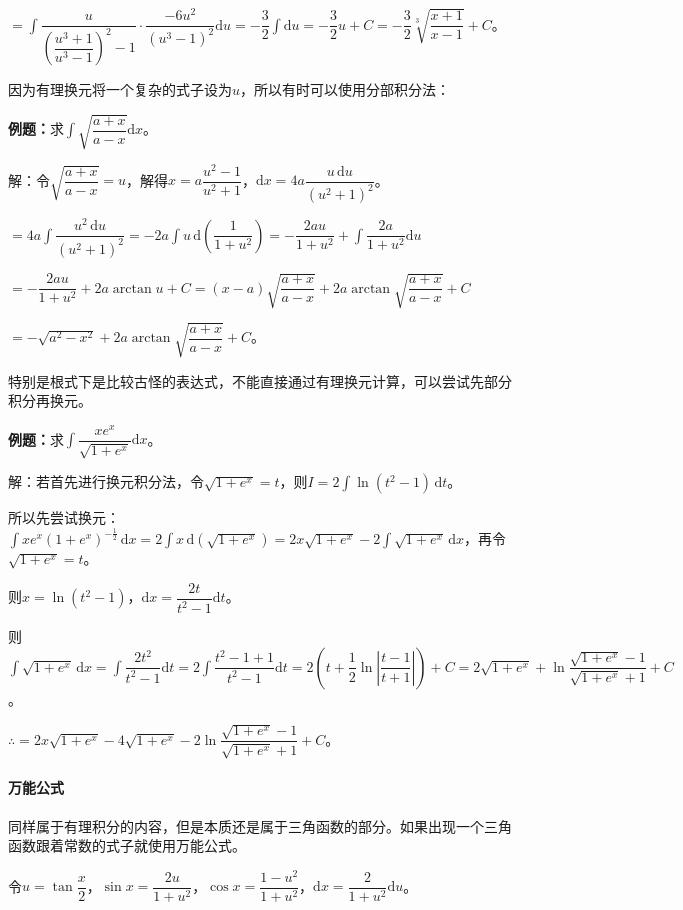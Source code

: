 \documentclass[UTF8, 12pt]{ctexart}
\begin{document}
$=\displaystyle{\int\dfrac{u}{\left(\dfrac{u^3+1}{u^3-1}\right)^2-1}\cdot\dfrac{-6u^2}{(u^3-1)^2}\textrm{d}u=-\dfrac{3}{2}\int\textrm{d}u}=-\dfrac{3}{2}u+C=-\dfrac{3}{2}\sqrt[3]{\dfrac{x+1}{x-1}}+C $。

因为有理换元将一个复杂的式子设为$u$，所以有时可以使用分部积分法：\medskip

\textbf{例题：}求$\displaystyle{\int\sqrt{\dfrac{a+x}{a-x}}\textrm{d}x}$。\medskip

解：令$\sqrt{\dfrac{a+x}{a-x}}=u$，解得$x=a\dfrac{u^2-1}{u^2+1}$，$\textrm{d}x=4a\dfrac{u\,\textrm{d}u}{(u^2+1)^2}$。

$=\displaystyle{4a\int\dfrac{u^2\,\textrm{d}u}{(u^2+1)^2}=-2a\int u\,\textrm{d}\left(\dfrac{1}{1+u^2}\right)=-\dfrac{2au}{1+u^2}+\int\dfrac{2a}{1+u^2}\textrm{d}u}$

$=-\dfrac{2au}{1+u^2}+2a\arctan u+C=(x-a)\sqrt{\dfrac{a+x}{a-x}}+2a\arctan\sqrt{\dfrac{a+x}{a-x}}+C$

$=-\sqrt{a^2-x^2}+2a\arctan\sqrt{\dfrac{a+x}{a-x}}+C$。

特别是根式下是比较古怪的表达式，不能直接通过有理换元计算，可以尝试先部分积分再换元。

\textbf{例题：}求$\displaystyle{\int\dfrac{xe^x}{\sqrt{1+e^x}}\textrm{d}x}$。

解：若首先进行换元积分法，令$\sqrt{1+e^x}=t$，则$I=2\int\ln(t^2-1)\,\textrm{d}t$。

所以先尝试换元：$\int xe^x(1+e^x)^{-\frac{1}{2}}\,\textrm{d}x=2\int x\,\textrm{d}(\sqrt{1+e^x})=2x\sqrt{1+e^x}-2\int\sqrt{1+e^x}\,\textrm{d}x$，再令$\sqrt{1+e^x}=t$。

则$x=\ln(t^2-1)$，$\textrm{d}x=\dfrac{2t}{t^2-1}\textrm{d}t$。

则$\displaystyle{\int\sqrt{1+e^x}\,\textrm{d}x=\int\dfrac{2t^2}{t^2-1}\textrm{d}t=2\int\dfrac{t^2-1+1}{t^2-1}\textrm{d}t}=2\left(t+\dfrac{1}{2}\ln\left\vert\dfrac{t-1}{t+1}\right\vert\right)+C=2\sqrt{1+e^x}+\ln\dfrac{\sqrt{1+e^x}-1}{\sqrt{1+e^x}+1}+C$。

$\therefore=2x\sqrt{1+e^x}-4\sqrt{1+e^x}-2\ln\dfrac{\sqrt{1+e^x}-1}{\sqrt{1+e^x}+1}+C$。

\paragraph{万能公式} \leavevmode \medskip

同样属于有理积分的内容，但是本质还是属于三角函数的部分。如果出现一个三角函数跟着常数的式子就使用万能公式。

令$u=\tan\dfrac{x}{2}$，$\sin x=\dfrac{2u}{1+u^2}$，$\cos x=\dfrac{1-u^2}{1+u^2}$，$\textrm{d}x=\dfrac{2}{1+u^2}\textrm{d}u$。
\end{document}
